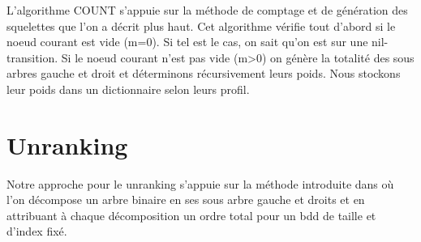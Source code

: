 \documentclass[french]{article}
\begin{document}
L'algorithme COUNT s'appuie sur la méthode de comptage et de génération des squelettes que l'on a décrit plus haut. Cet algorithme vérifie tout d'abord si le noeud courant est vide (m=0). Si tel est le cas, on sait qu'on est sur une nil-transition. Si le noeud courant n'est pas vide (m>0) on génère la totalité des sous arbres gauche et droit et déterminons récursivement leurs poids. Nous stockons leur poids dans un dictionnaire selon leurs profil.
\begin{algorithm}
  \begin{algorithmic}[1]
    \Statex
      \State {}
      \State {} 
        \State {}
            \State {}
        \EndIf
      \Else
            \State {}
            \Else
                \EndFor
            \EndIf
                \State {}
                \State {}
                \Else
                        \State {}
                    \EndFor
                \EndIf
                    \State {}
                    \State {}
                    \Else
                    \EndIf\EndFor\EndFor\EndFor\EndIf
      \State {}
    \EndFunction
  \end{algorithmic}
\end{algorithm}

\newpage
\section{Unranking}
Notre approche pour le unranking s'appuie sur la méthode introduite dans \cite{wilf} où l'on décompose un arbre binaire en ses sous arbre gauche et droits et en attribuant à chaque décomposition un ordre total pour un bdd de taille et d'index fixé.
\end{document}
